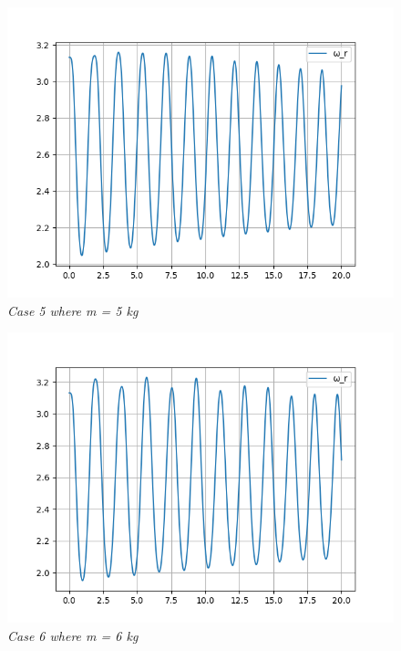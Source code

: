         \begin{figure}[H]
            \centering
            \includegraphics{Appendix/RSimPictures/F/fm5.png}
            \caption{\textit{Case 5 where m = 5 kg}}
            \label{}
        \end{figure}
            
        \begin{figure}[H]
            \centering
            \includegraphics{Appendix/RSimPictures/F/fm6.png}
            \caption{\textit{Case 6 where m = 6 kg}}
            \label{}
        \end{figure}
            
